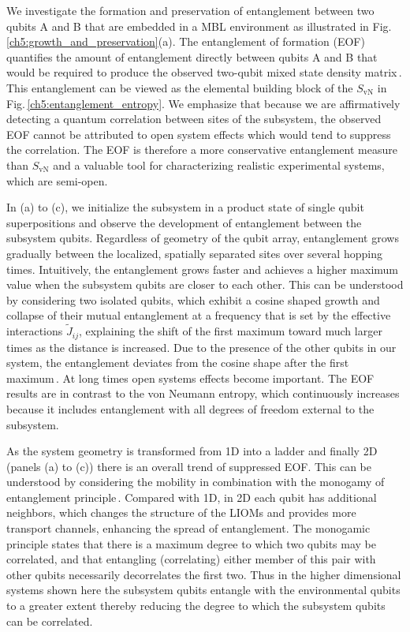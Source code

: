 We investigate the formation and preservation of entanglement between two qubits A and B that are embedded in a MBL environment as illustrated in Fig.\,\ref{ch5:growth_and_preservation}(a). The entanglement of formation (EOF) quantifies the amount of entanglement directly between qubits A and B that would be required to produce the observed two-qubit mixed state density matrix\,\cite{Wootters1998}.   This entanglement can be viewed as the elemental building block of the $S_{\text{vN}}$ in Fig.\,\ref{ch5:entanglement_entropy}. We emphasize that because we are affirmatively detecting a quantum correlation between sites of the subsystem, the observed EOF cannot be attributed to open system effects which would tend to suppress the correlation.  The EOF is therefore a more conservative entanglement measure than $S_{\text{vN}}$ and a valuable tool for characterizing realistic experimental systems, which are semi-open.

In (a) to (c), we initialize the subsystem in a product state of single qubit superpositions and observe the development of entanglement between the subsystem qubits. Regardless of geometry of the qubit array, entanglement grows gradually between the localized, spatially separated sites over several hopping times.  Intuitively, the entanglement grows faster and achieves a higher maximum value when the subsystem qubits are closer to each other. This can be understood by considering two isolated qubits, which exhibit a cosine shaped growth and collapse of their mutual entanglement at a frequency that is set by the effective interactions $\widetilde{J}_{ij}$, explaining the shift of the first maximum toward much larger times as the distance is increased. Due to the presence of the other qubits in our system, the entanglement deviates from the cosine shape after the first maximum\,\cite{Serbyn2013b}.  At long times open systems effects become important. The EOF results are in contrast to the von Neumann entropy, which continuously increases because it includes entanglement with all degrees of freedom external to the subsystem.

As the system geometry is transformed from 1D into a ladder and finally 2D (panels (a) to (c)) there is an overall trend of suppressed EOF.  This can be understood by considering the mobility in combination with the monogamy of entanglement principle\,\cite{Wootters2000}. Compared with 1D, in 2D each qubit has additional neighbors, which changes the structure of the LIOMs and provides more transport channels, enhancing the spread of entanglement.  The monogamic principle states that there is a maximum degree to which two qubits may be correlated, and that entangling (correlating) either member of this pair with other qubits necessarily decorrelates the first two.  Thus in the higher dimensional systems shown here the subsystem qubits entangle with the environmental qubits to a greater extent thereby reducing the degree to which the subsystem qubits can be correlated.

